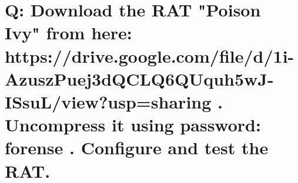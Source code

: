 \documentclass[10pt,a4paper]{article} %
\begin{document}

    \section{Q: Download the RAT "Poison Ivy" from here:
        https://drive.google.com/file/d/1i-AzuszPuej3dQCLQ6QUquh5wJ-ISsuL/view?usp=sharing
        . Uncompress it using password: forense . Configure and test the RAT.}















    \nocite{*}
    
    
\end{document}
